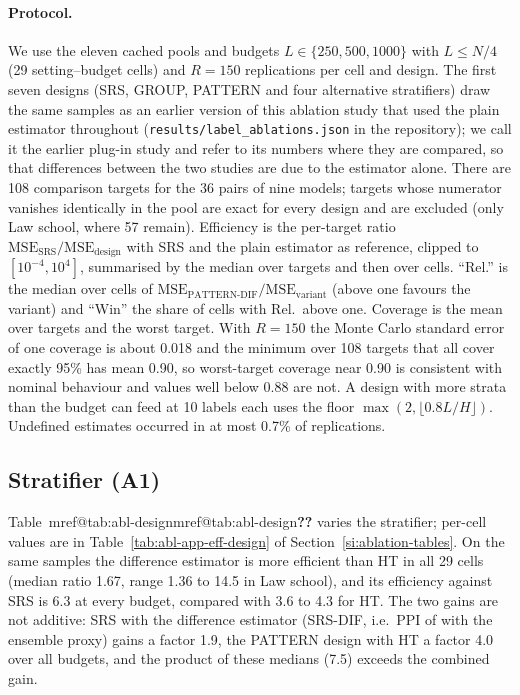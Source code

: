 \documentclass[pdflatex,sn-mathphys-num,iicol]{sn-jnl}
\makeatletter
\theoremstyle{thmstyleone}
\theoremstyle{thmstyletwo}
\theoremstyle{thmstylethree}
\newcommand{\Mref}[1]{\ifcsname mref@#1\endcsname\csname mref@#1\endcsname\else\textbf{??}\fi}
\makeatother
\begin{document}
\paragraph{Protocol.} We use the eleven cached pools and budgets $L\in\{250,500,1000\}$ with $L\le N/4$ (29 setting--budget cells) and $R=150$ replications per cell and design. The first seven designs (SRS, GROUP, PATTERN and four alternative stratifiers) draw the same samples as an earlier version of this ablation study that used the plain estimator throughout (\texttt{results/label\_ablations.json} in the repository); we call it the earlier plug-in study and refer to its numbers where they are compared, so that differences between the two studies are due to the estimator alone. There are 108 comparison targets for the 36 pairs of nine models; targets whose numerator vanishes identically in the pool are exact for every design and are excluded (only Law school, where 57 remain). Efficiency is the per-target ratio $\mathrm{MSE}_{\mathrm{SRS}}/\mathrm{MSE}_{\mathrm{design}}$ with SRS and the plain estimator as reference, clipped to $[10^{-4},10^{4}]$, summarised by the median over targets and then over cells. ``Rel.'' is the median over cells of $\mathrm{MSE}_{\mathrm{PATTERN\text{-}DIF}}/\mathrm{MSE}_{\mathrm{variant}}$ (above one favours the variant) and ``Win'' the share of cells with Rel.\ above one. Coverage is the mean over targets and the worst target. With $R=150$ the Monte Carlo standard error of one coverage is about 0.018 and the minimum over 108 targets that all cover exactly 95\% has mean 0.90, so worst-target coverage near 0.90 is consistent with nominal behaviour and values well below 0.88 are not. A design with more strata than the budget can feed at 10 labels each uses the floor $\max(2,\lfloor 0.8L/H\rfloor)$. Undefined estimates occurred in at most 0.7\% of replications.

\subsection{Stratifier (A1)}

Table~\Mref{tab:abl-design} varies the stratifier; per-cell values are in Table~\ref{tab:abl-app-eff-design} of Section~\ref{si:ablation-tables}. On the same samples the difference estimator is more efficient than HT in all 29 cells (median ratio 1.67, range 1.36 to 14.5 in Law school), and its efficiency against SRS is 6.3 at every budget, compared with 3.6 to 4.3 for HT. The two gains are not additive: SRS with the difference estimator (SRS-DIF, i.e.\ PPI of \citealt{angelopoulos2023ppi} with the ensemble proxy) gains a factor 1.9, the PATTERN design with HT a factor 4.0 over all budgets, and the product of these medians (7.5) exceeds the combined gain.
\end{document}
